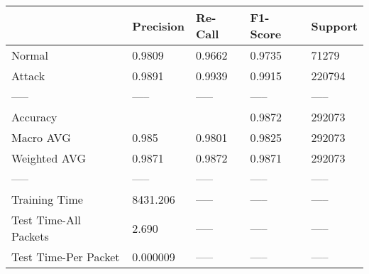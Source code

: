 \begin{tabular}{lllll}
\toprule
{} & Precision & Re-Call & F1-Score & Support \\
\midrule
Normal                &    0.9809 &  0.9662 &   0.9735 &   71279 \\
Attack                &    0.9891 &  0.9939 &   0.9915 &  220794 \\
-----                 &     ----- &   ----- &    ----- &   ----- \\
Accuracy              &           &         &   0.9872 &  292073 \\
Macro AVG             &     0.985 &  0.9801 &   0.9825 &  292073 \\
Weighted AVG          &    0.9871 &  0.9872 &   0.9871 &  292073 \\
-----                 &     ----- &   ----- &    ----- &   ----- \\
Training Time         &  8431.206 &   ----- &    ----- &   ----- \\
Test Time-All Packets &     2.690 &   ----- &    ----- &   ----- \\
Test Time-Per Packet  &  0.000009 &   ----- &    ----- &   ----- \\
\bottomrule
\end{tabular}
